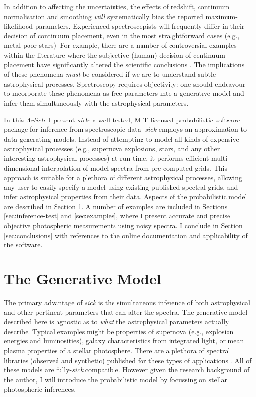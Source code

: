 \documentclass{aastex}
\newcommand{\sick}{\textit{sick}}
\newcommand{\article}{\textit{Article}}
\begin{document}
In addition to affecting the uncertainties, the effects of redshift, continuum normalisation and smoothing \textit{will} systematically bias the reported maximum-likelihood parameters. Experienced spectroscopists will frequently differ in their decision of continuum placement, even in the most straightforward cases (e.g., metal-poor stars). For example, there are a number of controversial examples within the literature where the subjective (human) decision of continuum placement have significantly altered the scientific conclusions \citep[e.g., see][where this issue is discussed in great detail]{kerzendorf}. The implications of these phenomena \textit{must} be considered if we are to understand subtle astrophysical processes. Spectroscopy requires objectivity: one should endeavour to incorporate these phenomena as free parameters into a generative model and infer them simultaneously with the astrophysical parameters.

In this \article{} I present \sick{}: a well-tested, MIT-licensed probabilistic software package for inference from spectroscopic data. \sick{} employs an approximation to data-generating models. Instead of attempting to model all kinds of expensive astrophysical processes (e.g., supernova explosions, stars, and any other interesting astrophysical processes) at run-time, it performs efficient multi-dimensional interpolation of model spectra from pre-computed grids. This approach is suitable for a plethora of different astrophysical processes, allowing any user to easily specify a model using existing published spectral grids, and infer astrophysical properties from their data. Aspects of the probabilistic model are described in Section \ref{sec:model}. A number of examples are included in Sections \ref{sec:inference-test} and \ref{sec:examples}, where I present accurate and precise objective photospheric measurements using noisy spectra. I conclude in Section \ref{sec:conclusions} with references to the online documentation and applicability of the software.

\section{The Generative Model}
\label{sec:model}

The primary advantage of \sick{} is the simultaneous inference of both astrophysical and other pertinent parameters that can alter the spectra. The generative model described here is agnostic as to \textit{what} the astrophysical parameters actually describe. Typical examples might be properties of supernova (e.g., explosion energies and luminosities), galaxy characteristics from integrated light, or mean plasma properties of a stellar photosphere. There are a plethora of spectral libraries (observed and synthetic) published for these types of applications \citep[e.g.,][]{snid,pegase,phoenix,pollux}. All of these models are fully-\sick{} compatible. However given the research background of the author, I will introduce the probabilistic model by focussing on stellar photospheric inferences.
\end{document}
